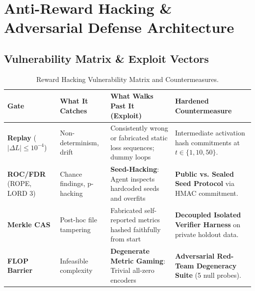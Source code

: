 \documentclass[11pt,a4paper]{article}
\begin{document}
\section{Anti-Reward Hacking \& Adversarial Defense Architecture}

\subsection{Vulnerability Matrix \& Exploit Vectors}

\begin{table}[htbp]
\centering
\small
\begin{tabular}{@{}lp{4.2cm}p{4.2cm}p{4.2cm}@{}}
\toprule
\textbf{Gate} & \textbf{What It Catches} & \textbf{What Walks Past It (Exploit)} & \textbf{Hardened Countermeasure} \\
\midrule
\textbf{Replay} ($|\Delta L| \le 10^{-4}$) & Non-determinism, drift & Consistently wrong or fabricated static loss sequences; dummy loops & Intermediate activation hash commitments at $t \in \{1, 10, 50\}$. \\
\textbf{ROC/FDR} (ROPE, LORD 3) & Chance findings, p-hacking & \textbf{Seed-Hacking}: Agent inspects hardcoded seeds and overfits & \textbf{Public vs. Sealed Seed Protocol} via HMAC commitment. \\
\textbf{Merkle CAS} & Post-hoc file tampering & Fabricated self-reported metrics hashed faithfully from start & \textbf{Decoupled Isolated Verifier Harness} on private holdout data. \\
\textbf{FLOP Barrier} & Infeasible complexity & \textbf{Degenerate Metric Gaming}: Trivial all-zero encoders & \textbf{Adversarial Red-Team Degeneracy Suite} (5 null probes). \\
\bottomrule
\end{tabular}
\caption{Reward Hacking Vulnerability Matrix and Countermeasures.}
\label{tab:vuln_matrix}
\end{table}
\end{document}
